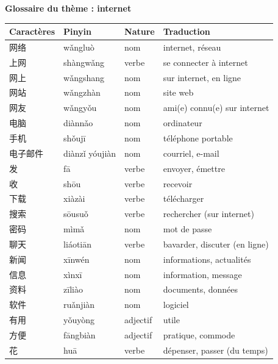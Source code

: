 \documentclass[11pt]{article}
\begin{document}
\textbf{Glossaire du thème : internet}\par

\begin{center}
\begin{tabularx}{\linewidth}{|X|X|X|X|}
\hline
\rowcolor{popblueL} Caractères & Pinyin & Nature & Traduction \\
\hline
网络 & wǎngluò & nom & internet, réseau \\
\hline
上网 & shàngwǎng & verbe & se connecter à internet \\
\hline
网上 & wǎngshang & nom & sur internet, en ligne \\
\hline
网站 & wǎngzhàn & nom & site web \\
\hline
网友 & wǎngyǒu & nom & ami(e) connu(e) sur internet \\
\hline
电脑 & diànnǎo & nom & ordinateur \\
\hline
手机 & shǒujī & nom & téléphone portable \\
\hline
电子邮件 & diànzǐ yóujiàn & nom & courriel, e-mail \\
\hline
发 & fā & verbe & envoyer, émettre \\
\hline
收 & shōu & verbe & recevoir \\
\hline
下载 & xiàzài & verbe & télécharger \\
\hline
搜索 & sōusuǒ & verbe & rechercher (sur internet) \\
\hline
密码 & mìmǎ & nom & mot de passe \\
\hline
聊天 & liáotiān & verbe & bavarder, discuter (en ligne) \\
\hline
新闻 & xīnwén & nom & informations, actualités \\
\hline
信息 & xìnxī & nom & information, message \\
\hline
资料 & zīliào & nom & documents, données \\
\hline
软件 & ruǎnjiàn & nom & logiciel \\
\hline
有用 & yǒuyòng & adjectif & utile \\
\hline
方便 & fāngbiàn & adjectif & pratique, commode \\
\hline
花 & huā & verbe & dépenser, passer (du temps) \\
\hline
\end{tabularx}
\end{center}
\end{document}
